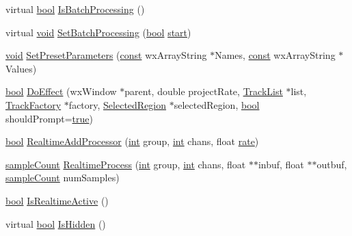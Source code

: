 \begin{DoxyCompactItemize}
\item 
virtual \hyperlink{mac_2config_2i386_2lib-src_2libsoxr_2soxr-config_8h_abb452686968e48b67397da5f97445f5b}{bool} \hyperlink{class_effect_a73de04b25490b3f14d9f9d7c3d3d3e97}{Is\+Batch\+Processing} ()
\item 
virtual \hyperlink{sound_8c_ae35f5844602719cf66324f4de2a658b3}{void} \hyperlink{class_effect_a50b511572a471486f7a48fe9c4750f96}{Set\+Batch\+Processing} (\hyperlink{mac_2config_2i386_2lib-src_2libsoxr_2soxr-config_8h_abb452686968e48b67397da5f97445f5b}{bool} \hyperlink{seqread_8c_ac503262ae470564980711da4f78b1181}{start})
\item 
\hyperlink{sound_8c_ae35f5844602719cf66324f4de2a658b3}{void} \hyperlink{class_effect_af7ff15cdb8f1495333ed1fc40afdaacc}{Set\+Preset\+Parameters} (\hyperlink{getopt1_8c_a2c212835823e3c54a8ab6d95c652660e}{const} wx\+Array\+String $\ast$Names, \hyperlink{getopt1_8c_a2c212835823e3c54a8ab6d95c652660e}{const} wx\+Array\+String $\ast$Values)
\item 
\hyperlink{mac_2config_2i386_2lib-src_2libsoxr_2soxr-config_8h_abb452686968e48b67397da5f97445f5b}{bool} \hyperlink{class_effect_a9c556ccf9bbea664dd4540be6cf38bbe}{Do\+Effect} (wx\+Window $\ast$parent, double project\+Rate, \hyperlink{class_track_list}{Track\+List} $\ast$list, \hyperlink{class_track_factory}{Track\+Factory} $\ast$factory, \hyperlink{class_selected_region}{Selected\+Region} $\ast$selected\+Region, \hyperlink{mac_2config_2i386_2lib-src_2libsoxr_2soxr-config_8h_abb452686968e48b67397da5f97445f5b}{bool} should\+Prompt=\hyperlink{mac_2config_2i386_2lib-src_2libsoxr_2soxr-config_8h_a41f9c5fb8b08eb5dc3edce4dcb37fee7}{true})
\item 
\hyperlink{mac_2config_2i386_2lib-src_2libsoxr_2soxr-config_8h_abb452686968e48b67397da5f97445f5b}{bool} \hyperlink{class_effect_a97a53b4a30871e07aae6c78f0bac8051}{Realtime\+Add\+Processor} (\hyperlink{xmltok_8h_a5a0d4a5641ce434f1d23533f2b2e6653}{int} group, \hyperlink{xmltok_8h_a5a0d4a5641ce434f1d23533f2b2e6653}{int} chans, float \hyperlink{seqread_8c_ad89d3fac2deab7a9cf6cfc8d15341b85}{rate})
\item 
\hyperlink{include_2audacity_2_types_8h_afa427e1f521ea5ec12d054e8bd4d0f71}{sample\+Count} \hyperlink{class_effect_af811746f495cef6e670c8bd01dc64361}{Realtime\+Process} (\hyperlink{xmltok_8h_a5a0d4a5641ce434f1d23533f2b2e6653}{int} group, \hyperlink{xmltok_8h_a5a0d4a5641ce434f1d23533f2b2e6653}{int} chans, float $\ast$$\ast$inbuf, float $\ast$$\ast$outbuf, \hyperlink{include_2audacity_2_types_8h_afa427e1f521ea5ec12d054e8bd4d0f71}{sample\+Count} num\+Samples)
\item 
\hyperlink{mac_2config_2i386_2lib-src_2libsoxr_2soxr-config_8h_abb452686968e48b67397da5f97445f5b}{bool} \hyperlink{class_effect_a9318a9b418fbc3ecbf4249b054661b94}{Is\+Realtime\+Active} ()
\item 
virtual \hyperlink{mac_2config_2i386_2lib-src_2libsoxr_2soxr-config_8h_abb452686968e48b67397da5f97445f5b}{bool} \hyperlink{class_effect_a363fee112c6454244f065ab1c6582ba1}{Is\+Hidden} ()
\end{DoxyCompactItemize}
